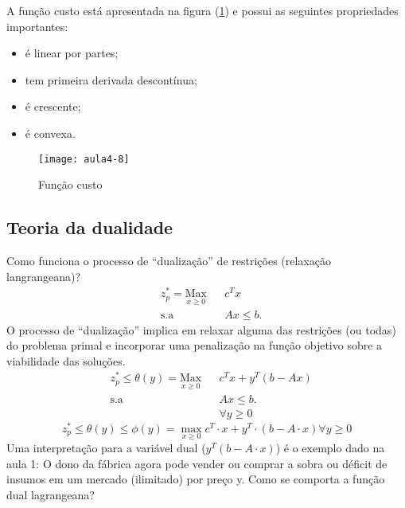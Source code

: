 A função custo está apresentada na figura (\ref{fig:aula4-8}) e possui as seguintes propriedades importantes:
\begin{itemize}
\item é linear por partes;
\item tem primeira derivada descontínua;
\item é crescente;
\item é convexa.
\end{itemize}
\begin{figure}[H]
\begin{centering}
\texttt{[image: aula4-8]}\protect\caption{\label{fig:aula4-8} Função custo}
\end{centering}
\end{figure}




\subsection{Teoria da dualidade}

Como funciona o processo de “dualização” de restrições (relaxação langrangeana)?
\begin{equation*}
\begin{aligned}
& z_{p}^{*}=\underset{x\geq0}{\text{Max}}
& & c^{T}x \\
& \text{s.a}
& & Ax \leq b.
\end{aligned}
\end{equation*}
O processo de ``dualização'' implica em relaxar alguma das restrições
(ou todas) do problema primal e incorporar uma penalização na função
objetivo sobre a viabilidade das soluções.
\begin{equation*}
\begin{aligned}
& z_{p}^{*}\leq \theta(y)=\underset{x\geq0}{\text{Max}}
& & c^{T}x+y^{T}(b-Ax)  \\
& \text{s.a}
& & Ax \leq b. \\
& & & \forall  y\geq 0 
\end{aligned}
\end{equation*}
\[
z_{p}^{*}\leq\theta(y)\leq\phi(y)=\max_{x\geq0}c^{T}\cdot x+y^{T}\cdot(b-A\cdot x)\forall y\geq0
\]
Uma interpretação para a variável dual ($y^{T}(b-A\cdot x)$) é o exemplo dado na aula 1: O dono da fábrica agora pode vender ou comprar a sobra ou déficit de insumos em um mercado (ilimitado) por preço y.
Como se comporta a função dual lagrangeana?

